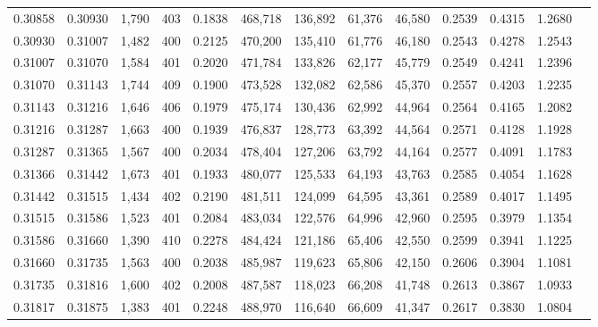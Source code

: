 \begin{tabular}{rrrrrrrrrrrrr}
0.30858 & 0.30930 &  1,790 & 403 &                                     0.1838 & 468,718 & 136,892 &  61,376 &  46,580 & 0.2539 & 0.4315 & 1.2680 \\
0.30930 & 0.31007 &  1,482 & 400 &                                     0.2125 & 470,200 & 135,410 &  61,776 &  46,180 & 0.2543 & 0.4278 & 1.2543 \\
0.31007 & 0.31070 &  1,584 & 401 &                                     0.2020 & 471,784 & 133,826 &  62,177 &  45,779 & 0.2549 & 0.4241 & 1.2396 \\
0.31070 & 0.31143 &  1,744 & 409 &                                     0.1900 & 473,528 & 132,082 &  62,586 &  45,370 & 0.2557 & 0.4203 & 1.2235 \\
0.31143 & 0.31216 &  1,646 & 406 &                                     0.1979 & 475,174 & 130,436 &  62,992 &  44,964 & 0.2564 & 0.4165 & 1.2082 \\
0.31216 & 0.31287 &  1,663 & 400 &                                     0.1939 & 476,837 & 128,773 &  63,392 &  44,564 & 0.2571 & 0.4128 & 1.1928 \\
0.31287 & 0.31365 &  1,567 & 400 &                                     0.2034 & 478,404 & 127,206 &  63,792 &  44,164 & 0.2577 & 0.4091 & 1.1783 \\
0.31366 & 0.31442 &  1,673 & 401 &                                     0.1933 & 480,077 & 125,533 &  64,193 &  43,763 & 0.2585 & 0.4054 & 1.1628 \\
0.31442 & 0.31515 &  1,434 & 402 &                                     0.2190 & 481,511 & 124,099 &  64,595 &  43,361 & 0.2589 & 0.4017 & 1.1495 \\
0.31515 & 0.31586 &  1,523 & 401 &                                     0.2084 & 483,034 & 122,576 &  64,996 &  42,960 & 0.2595 & 0.3979 & 1.1354 \\
0.31586 & 0.31660 &  1,390 & 410 &                                     0.2278 & 484,424 & 121,186 &  65,406 &  42,550 & 0.2599 & 0.3941 & 1.1225 \\
0.31660 & 0.31735 &  1,563 & 400 &                                     0.2038 & 485,987 & 119,623 &  65,806 &  42,150 & 0.2606 & 0.3904 & 1.1081 \\
0.31735 & 0.31816 &  1,600 & 402 &                                     0.2008 & 487,587 & 118,023 &  66,208 &  41,748 & 0.2613 & 0.3867 & 1.0933 \\
0.31817 & 0.31875 &  1,383 & 401 &                                     0.2248 & 488,970 & 116,640 &  66,609 &  41,347 & 0.2617 & 0.3830 & 1.0804 \\

\end{tabular}
